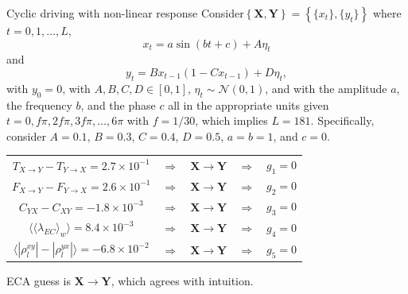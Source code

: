 \documentclass{beamer}
\begin{document}
\begin{frame}{Cyclic driving with non-linear response}
Consider$\left\{\mathbf{X},\mathbf{Y}\right\} = \left\{\{x_t\},\{y_t\}\right\}$ where $t=0,1,\ldots,L$,
\begin{equation*}
x_t = a\sin(bt+c)+A\eta_t
\end{equation*}
and
\begin{equation*}
y_t = Bx_{t-1}\left(1-Cx_{t-1}\right)+D\eta_t,
\end{equation*}
with $y_0 = 0$, with $A,B,C,D\in[0,1]$, $\eta_t\sim\mathcal{N}\left(0,1\right)$, and with the amplitude $a$, the frequency $b$, and the phase $c$ all in the appropriate units given $t=0,f\pi,2f\pi,3f\pi,\ldots,6\pi$ with $f=1/30$, which implies $L=181$.  Specifically, consider $A=0.1$, $B=0.3$, $C=0.4$, $D=0.5$, $a=b=1$, and $c=0$.
\begin{center}
\begin{tabular}{ccccc}
$T_{X\rightarrow Y}-T_{Y\rightarrow X} =2.7\times 10^{-1}$&$\Rightarrow$&$\mathbf{X}\rightarrow\mathbf{Y}$&$\Rightarrow$&$g_1 = 0$\\
$F_{X\rightarrow Y}-F_{Y\rightarrow X}=2.6\times 10^{-1}$&$\Rightarrow$&$\mathbf{X}\rightarrow\mathbf{Y}$&$\Rightarrow$&$g_2 = 0$\\
$C_{YX}-C_{XY}=-1.8\times 10^{-3}$&$\Rightarrow$&$\mathbf{X}\rightarrow\mathbf{Y}$&$\Rightarrow$&$g_3 = 0$\\
$\langle\langle\lambda_{EC}\rangle_w\rangle=8.4\times 10^{-3}$&$\Rightarrow$&$\mathbf{X}\rightarrow\mathbf{Y}$&$\Rightarrow$&$g_4 = 0$\\
$\langle|\rho^{xy}_l| - |\rho^{yx}_l|\rangle=-6.8\times 10^{-2}$&$\Rightarrow$&$\mathbf{X}\rightarrow\mathbf{Y}$&$\Rightarrow$&$g_5 = 0$
\end{tabular}
\end{center}
ECA guess is $\mathbf{X}\rightarrow\mathbf{Y}$, which agrees with intuition.
\end{frame}
\end{document}
